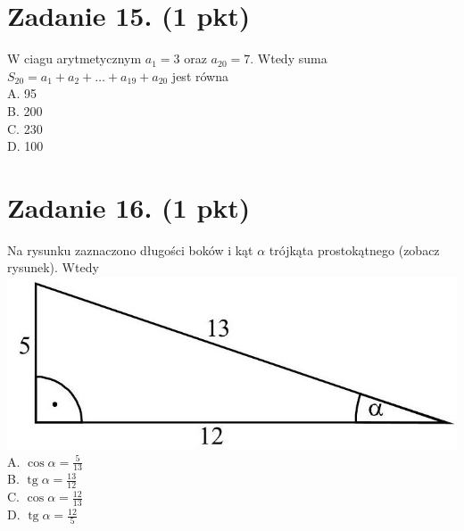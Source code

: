 \documentclass[10pt]{article}
\begin{document}
\section*{Zadanie 15. (1 pkt)}
W ciagu arytmetycznym \(a_{1}=3\) oraz \(a_{20}=7\). Wtedy suma \(S_{20}=a_{1}+a_{2}+\ldots+a_{19}+a_{20}\) jest równa\\
A. 95\\
B. 200\\
C. 230\\
D. 100

\section*{Zadanie 16. (1 pkt)}
Na rysunku zaznaczono długości boków i kąt \(\alpha\) trójkąta prostokątnego (zobacz rysunek). Wtedy\\
\includegraphics[max width=\textwidth, center]{2024_11_21_603d5c1b2a7d8d68f45fg-06}\\
A. \(\cos \alpha=\frac{5}{13}\)\\
B. \(\operatorname{tg} \alpha=\frac{13}{12}\)\\
C. \(\cos \alpha=\frac{12}{13}\)\\
D. \(\operatorname{tg} \alpha=\frac{12}{5}\)\\
\end{document}
